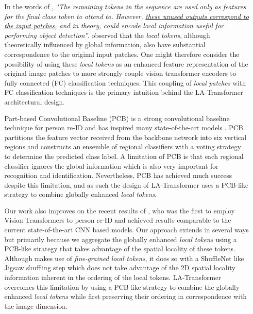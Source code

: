 \documentclass{article}
\begin{document}
In the words of \citet{transformerbased_obj_detection}, \textit{"The remaining tokens in the sequence are used only as features for the final class token to attend to. However, \underline{these unused outputs correspond to the input patches}, and in theory, could encode local information useful for performing object detection"}.\citet{transformerbased_obj_detection} observed that the \textit{local tokens}, although theoretically influenced by global information, also have substantial correspondence to the original input patches. One might therefore consider the possibility of using these \textit{local tokens} as an enhanced feature representation of the original image patches to more strongly couple vision transformer encoders to fully connected (FC) classification techniques. This coupling of \textit{local patches} with FC classification techniques is the primary intuition behind the LA-Transformer architectural design.

Part-based Convolutional Baseline (PCB) \citep{PCB} is a strong convolutional baseline technique for person re-ID and has inspired many state-of-the-art models \citep{STReid, beyond_human_parts, pyramid}. PCB partitions the feature vector received from the backbone network into six vertical regions and constructs an ensemble of regional classifiers with a voting strategy to determine the predicted class label. A limitation of PCB is that each regional classifier ignores the global information which is also very important for recognition and identification. Nevertheless, PCB has achieved much success despite this limitation, and as such the design of LA-Transformer uses a PCB-like strategy to combine globally enhanced \textit{local tokens}. 

Our work also improves on the recent results of \citet{TransReID}, who was the first to employ Vision Transformers to person re-ID and achieved results comparable to the current state-of-the-art CNN based models. Our approach extends \citet{TransReID} in several ways but primarily because we aggregate the globally enhanced \textit{local tokens} using a PCB-like strategy that takes advantage of the spatial locality of these tokens. Although \citet{TransReID} makes use of \textit{fine-grained local tokens}, it does so with a ShuffleNet \citep{shufflenet} like Jigsaw shuffling step which does not take advantage of the 2D spatial locality information inherent in the ordering of the local tokens. LA-Transformer overcomes this limitation by using a PCB-like strategy to combine the globally enhanced \textit{local tokens} while first preserving their ordering in correspondence with the image dimension.
\end{document}
